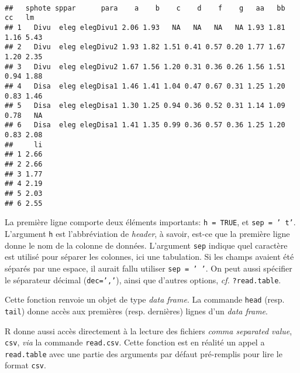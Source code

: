 \begin{knitrout}
\color{fgcolor}\begin{kframe}
\begin{flushleft}
\ttfamily\noindent
{}\hlassignement{\usebox{\hlnormalsizeboxlessthan}-}{\ }\hlkeyword{(}\hlkeyword{,}{\ }\hlargument{=}{\ }\hlkeyword{,}{\ }\hlargument{=}{\ }\hlkeyword{)}\hspace*{\fill}\\
\hlstd{}\hlkeyword{(}\hlkeyword{)}\mbox{}
\normalfont
\end{flushleft}
\begin{verbatim}
##   sphote sppar      para    a    b    c    d    f    g   aa   bb   cc   lm
## 1   Divu  eleg elegDivu1 2.06 1.93   NA   NA   NA   NA 1.93 1.81 1.16 5.43
## 2   Divu  eleg elegDivu2 1.93 1.82 1.51 0.41 0.57 0.20 1.77 1.67 1.20 2.35
## 3   Divu  eleg elegDivu2 1.67 1.56 1.20 0.31 0.36 0.26 1.56 1.51 0.94 1.88
## 4   Disa  eleg elegDisa1 1.46 1.41 1.04 0.47 0.67 0.31 1.25 1.20 0.83 1.46
## 5   Disa  eleg elegDisa1 1.30 1.25 0.94 0.36 0.52 0.31 1.14 1.09 0.78   NA
## 6   Disa  eleg elegDisa1 1.41 1.35 0.99 0.36 0.57 0.36 1.25 1.20 0.83 2.08
##     li
## 1 2.66
## 2 2.66
## 3 1.77
## 4 2.19
## 5 2.03
## 6 2.55
\end{verbatim}
\end{kframe}
\end{knitrout}


La première ligne comporte deux éléments importants: \texttt{h = TRUE}, et \texttt{sep = '\ t'}.
L'argument \texttt{h} est l'abbréviation de \emph{header}, à savoir, est-ce que la première ligne donne le nom de la colonne de données.
L'argument \texttt{sep} indique quel caractère est utilisé pour séparer les colonnes, ici une tabulation.
Si les champs avaient été séparés par une espace, il aurait fallu utiliser \texttt{sep = ' '}.
On peut aussi spécifier le séparateur décimal (\texttt{dec=','}), ainsi que d'autres options, \emph{cf.} \texttt{?read.table}.

Cette fonction renvoie un objet de type \emph{data frame}. La commande \texttt{head} (resp. \texttt{tail}) donne accès aux premières (resp. dernières) lignes d'un \emph{data frame}. 

R donne aussi accès directement à la lecture des fichiers \emph{comma separated value}, \texttt{csv}, \emph{via} la commande \texttt{read.csv}.
Cette fonction est en réalité un appel a \texttt{read.table} avec une partie des arguments par défaut pré-remplis pour lire le format \texttt{csv}.

